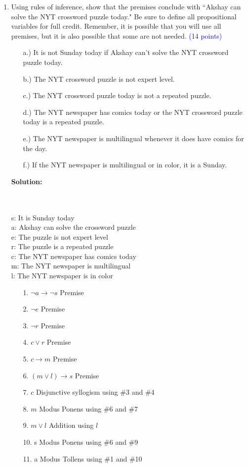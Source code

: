 \documentclass{article}
\newcommand{\pt}[1]{\textcolor{blue}{(#1 points)}}
\newenvironment{solution}
{
\par
\color{blue}
\textbf{Solution:}
}
{
\par
}
\begin{document}
\begin{enumerate}
    \item Using rules of inference, show that the premises conclude with ``Akshay can solve the NYT crossword puzzle today." Be sure to define all propositional variables for full credit. Remember, it is possible that you will use all premises, but it is also possible that some are not needed. \pt{14}
    \begin{enumerate}
        \item[a.)] It is not Sunday today if Akshay can't solve the NYT crossword puzzle today.
        \item[b.)] The NYT crossword puzzle is not expert level.
        \item[c.)] The NYT crossword puzzle today is not a repeated puzzle.
        \item[d.)] The NYT newspaper has comics today or the NYT crossword puzzle today is a repeated puzzle.
        \item[e.)] The NYT newspaper is multilingual whenever it does have comics for the day.
        \item[f.)] If the NYT newspaper is multilingual or in color, it is a Sunday.
    \end{enumerate}
    
        \begin{solution}
        \color{blue}
            \\
            \\ s: It is Sunday today
            \\ a: Akshay can solve the crossword puzzle
            \\ e: The puzzle is not expert level
            \\ r: The puzzle is a repeated puzzle
            \\ c: The NYT newspaper has comics today
            \\ m: The NYT newspaper is multilingual
            \\ l: The NYT newspaper is in color
    \color{blue}        
     \begin{enumerate}
         \item[1.] $\lnot a \rightarrow \lnot s$ \hfill Premise
         \item[2.] $\lnot e$ \hfill Premise
         \item[3.] $\lnot r$ \hfill Premise     
         \item[4.] $c \lor r$ \hfill Premise
         \item[5.] $c \rightarrow m$ \hfill Premise
         \item[6.] $(m \lor l) \rightarrow s$ \hfill Premise
         \item[7.] $c$ \hfill Disjunctive syllogism using \#3 and \#4
         \item[8.] $m$ \hfill Modus Ponens using \#6 and \#7
         \item[9.] $m \lor l$ \hfill Addition using $l$
         \item[10.] s \hfill Modus Ponens using \#6 and \#9
         \item[11.] a \hfill Modus Tollens using \#1 and \#10
     \end{enumerate}


\end{solution}
\end{enumerate}
\end{document}
